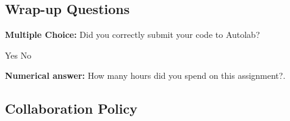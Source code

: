 \documentclass[11pt,addpoints,answers]{exam}
\numberwithin{equation}{section} %
\numberwithin{figure}{section} %
\numberwithin{table}{section} %
\begin{document}
\subsection{Wrap-up Questions}

\begin{questions}

\question[1] \textbf{Multiple Choice:} Did you correctly submit your code to Autolab?
    \begin{checkboxes}
     \choice Yes 
     \choice No
    \end{checkboxes}

\question[1] \textbf{Numerical answer:} How many hours did you spend on this assignment?.
    \begin{tcolorbox}[fit,height=1cm, width=2cm, blank, borderline={1pt}{-2pt}]
    \end{tcolorbox}

\end{questions}

\clearpage
\subsection{Collaboration Policy}
\end{document}
